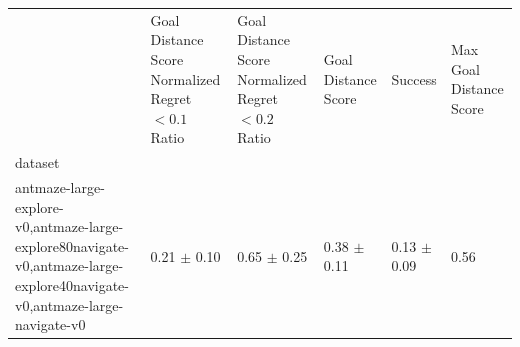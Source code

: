 \begin{tabular}{llllll}
\toprule
 & Goal Distance Score Normalized Regret $< 0.1$ Ratio & Goal Distance Score Normalized Regret $< 0.2$ Ratio & Goal Distance Score & Success & Max Goal Distance Score \\
dataset &  &  &  &  &  \\
\midrule
antmaze-large-explore-v0,antmaze-large-explore80navigate-v0,antmaze-large-explore40navigate-v0,antmaze-large-navigate-v0 & 0.21 $\pm$ 0.10 & 0.65 $\pm$ 0.25 & 0.38 $\pm$ 0.11 & 0.13 $\pm$ 0.09 & 0.56 \\
\bottomrule
\end{tabular}
